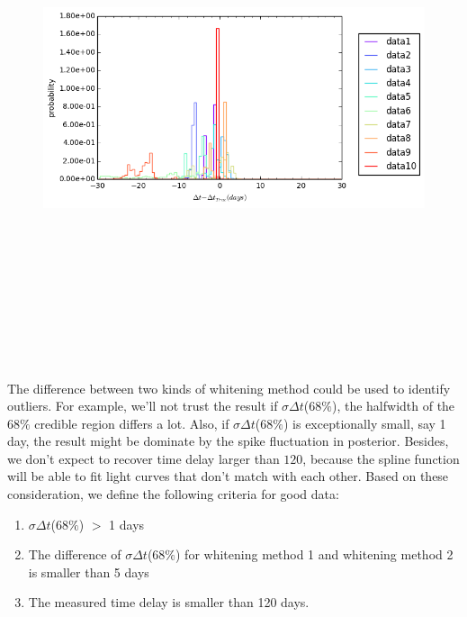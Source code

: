 \documentclass[\docopts]{\docclass}
\begin{document}
\begin{figure}[!h]
\includegraphics[width=\textwidth, height=15cm, keepaspectratio]{summary_posterior_summary_newWhiten.png}
\caption{}
\label{fig:summary_post_newWhiten}
\end{figure}

The difference between two kinds of whitening method could be used to identify outliers. For example, we'll not trust the result if $\sigma\Delta t$($68\%$), the halfwidth of the $68\%$ credible region differs a lot. Also, if $\sigma\Delta t$($68\%$) is exceptionally small, say 1 day, the result might be dominate by the spike fluctuation in posterior. Besides, we don't expect to recover time delay larger than $120$, because the spline function will be able to fit light curves that don't match with each other.  Based on these consideration, we define the following criteria for good data:
\begin{enumerate}
\item $\sigma\Delta t$($68\%$) $>$ 1 days
\item The difference of $\sigma\Delta t$($68\%$) for whitening method 1 and whitening method 2 is smaller than 5 days
\item The measured time delay is smaller than 120 days. 
\end{enumerate}
\end{document}
